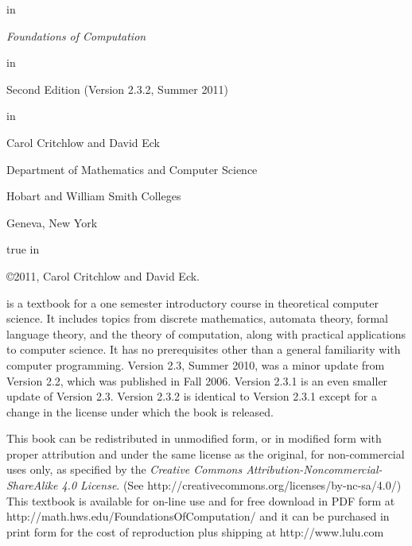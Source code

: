 \begin{titlepage}

 in 
\centerline{\Huge \textit{Foundations of Computation}}
 in
\centerline{Second Edition (Version 2.3.2, Summer 2011)}
 in
\centerline{\Large Carol Critchlow and David Eck}
\medskip
\centerline{Department of Mathematics and Computer Science}
\smallskip
\centerline{Hobart and William Smith Colleges}
\smallskip
\centerline{Geneva, New York}



\newpage
{} true in

{\narrower

\noindent \copyright 2011, Carol Critchlow and David Eck.
\bigskip

\noindent {} is a textbook for a one semester introductory course
in theoretical computer science.  It includes topics from discrete mathematics,
automata theory, formal language theory, and the theory of computation, along with
practical applications to computer science. It has no prerequisites other than a
general familiarity with computer programming.  Version 2.3, Summer 2010, was a minor 
update from Version 2.2, which was published in Fall 2006.  Version 2.3.1 is an even
smaller update of Version 2.3.  Version 2.3.2 is identical to Version 2.3.1 except for
a change in the license under which the book is released.

\bigskip


\small{%
\noindent This book can be redistributed in unmodified form,
or in modified form with proper attribution and under the same license as the original, 
for non-commercial uses only, as specified by the
\textit{Creative Commons Attribution-Noncommercial-ShareAlike 4.0 License}.
(See http://creativecommons.org/licenses/by-nc-sa/4.0/)\\[8pt]
This textbook is available for on-line use and for free download
in PDF form at http://math.hws.edu/FoundationsOfComputation/
and it can be purchased in print form for the cost of reproduction
plus shipping at http://www.lulu.com}


}



\end{titlepage}


